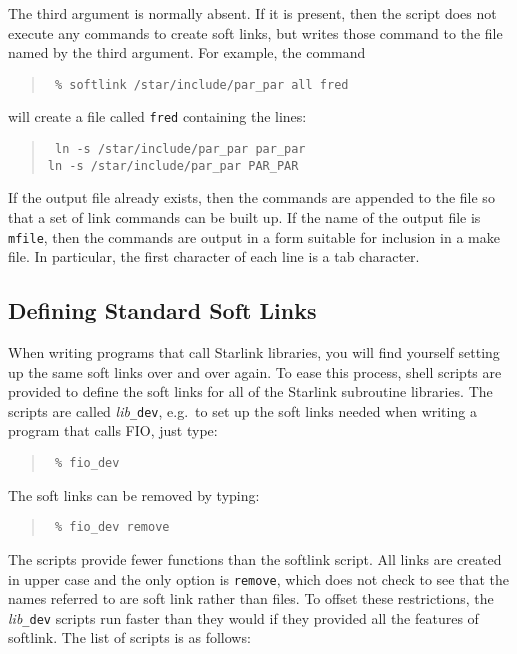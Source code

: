 The third argument is normally absent. If it is present, then the script does
not execute any commands to create soft links, but writes those command to the
file named by the third argument. For example, the command

\begin{quote}{\tt
\% softlink /star/include/par\_par all fred
}
\end{quote}

will create a file called {\tt fred} containing the lines:

\begin{quote}{\tt
ln -s /star/include/par\_par par\_par \\
ln -s /star/include/par\_par PAR\_PAR
}
\end{quote}

If the output file already exists, then the commands are appended to the file
so that a set of link commands can be built up. If the name of the output file
is {\tt mfile}, then the commands are output in a form suitable for inclusion
in a make file. In particular, the first character of each line is a tab
character.

\subsection{Defining Standard Soft Links}

When writing programs that call Starlink libraries, you will find yourself
setting up the same soft links over and over again. To ease this process, shell
scripts are provided to define the soft links for all of the Starlink
subroutine libraries. The scripts are called {\it lib}{\tt\_dev}, e.g.\ to set
up the soft links needed when writing a program that calls FIO, just type:

\begin{quote}{\tt
\% fio\_dev
}
\end{quote}

The soft links can be removed by typing:

\begin{quote}{\tt
\% fio\_dev remove
}
\end{quote}

The scripts provide fewer functions than the softlink script. All links are
created in upper case and the only option is {\tt remove}, which does not check
to see that the names referred to are soft link rather than files. To offset
these restrictions, the {\it lib}{\tt\_dev} scripts run faster than they would
if they provided all the features of softlink. The list of scripts is as
follows:

